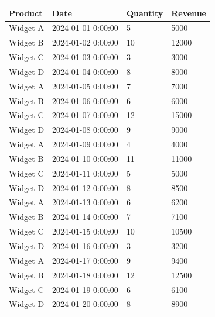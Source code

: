 \documentclass[11pt,a4paper]{article}
\begin{document}
\begin{table}[h]
\begin{tabular}{|l|l|l|l|}
\hline
Product & Date & Quantity & Revenue \\ \hline
Widget A & 2024-01-01 0:00:00 & 5 & 5000 \\ \hline
Widget B & 2024-01-02 0:00:00 & 10 & 12000 \\ \hline
Widget C & 2024-01-03 0:00:00 & 3 & 3000 \\ \hline
Widget D & 2024-01-04 0:00:00 & 8 & 8000 \\ \hline
Widget A & 2024-01-05 0:00:00 & 7 & 7000 \\ \hline
Widget B & 2024-01-06 0:00:00 & 6 & 6000 \\ \hline
Widget C & 2024-01-07 0:00:00 & 12 & 15000 \\ \hline
Widget D & 2024-01-08 0:00:00 & 9 & 9000 \\ \hline
Widget A & 2024-01-09 0:00:00 & 4 & 4000 \\ \hline
Widget B & 2024-01-10 0:00:00 & 11 & 11000 \\ \hline
Widget C & 2024-01-11 0:00:00 & 5 & 5000 \\ \hline
Widget D & 2024-01-12 0:00:00 & 8 & 8500 \\ \hline
Widget A & 2024-01-13 0:00:00 & 6 & 6200 \\ \hline
Widget B & 2024-01-14 0:00:00 & 7 & 7100 \\ \hline
Widget C & 2024-01-15 0:00:00 & 10 & 10500 \\ \hline
Widget D & 2024-01-16 0:00:00 & 3 & 3200 \\ \hline
Widget A & 2024-01-17 0:00:00 & 9 & 9400 \\ \hline
Widget B & 2024-01-18 0:00:00 & 12 & 12500 \\ \hline
Widget C & 2024-01-19 0:00:00 & 6 & 6100 \\ \hline
Widget D & 2024-01-20 0:00:00 & 8 & 8900 \\ \hline
\end{tabular}
\end{table}
\end{document}
